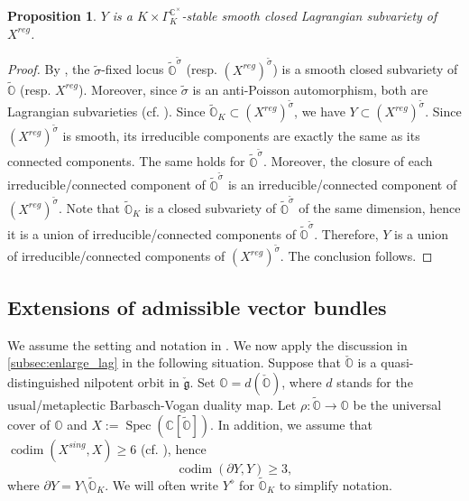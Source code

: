 \documentclass[11pt, a4paper]{amsart}
\newcommand{\C}{\mathbb{C}}
\newcommand{\orb}{\mathbb{O}}
\newcommand{\torbk}{\widetilde{\orb}_{K}}
\newcommand{\fg}{\mathfrak{g}}
\newcommand{\ckfg}{{\check{\fg}}}
\newcommand{\ckorb}{\check{\orb}}
\DeclareMathOperator{\codim}{codim}
\newcommand{\cm}{\C^\times}
\newcommand{\spec}{\operatorname{Spec}}
\newtheorem{Prop}[Thm]{Proposition}
\theoremstyle{definition}
\numberwithin{equation}{section}
\begin{document}
\begin{Prop} \label{prop:Y_lag}
	$Y$ is a $K \times \Gamma_K^{\cm}$-stable smooth closed Lagrangian subvariety of $X^{reg}$.
\end{Prop}

\begin{proof}
	By \cite[Proposition 3.4]{Edixhoven}, the $\tilde{\sigma}$-fixed locus $\widetilde{\orb}^{\tilde{\sigma}}$ (resp. $(X^{reg})^{\tilde{\sigma}}$) is a smooth closed subvariety of $\widetilde{\orb}$ (resp. $X^{reg}$). Moreover, since $\tilde{\sigma}$ is an anti-Poisson automorphism, both are Lagrangian subvarieties (cf. \cite[Corollary 5.20]{Vogan_AV}). Since $\torbk \subset (X^{reg})^{\tilde{\sigma}}$, we have $Y \subset (X^{reg})^{\tilde{\sigma}}$. Since $(X^{reg})^{\tilde{\sigma}}$ is smooth, its irreducible components are exactly the same as its connected components. The same holds for $\widetilde{\orb}^{\tilde{\sigma}}$. Moreover, the closure of each irreducible/connected component of $\widetilde{\orb}^{\tilde{\sigma}}$ is an irreducible/connected component of $(X^{reg})^{\tilde{\sigma}}$. Note that $\torbk$ is a closed subvariety of $\widetilde{\orb}^{\tilde{\sigma}}$ of the same dimension, hence it is a union of irreducible/connected components of $\widetilde{\orb}^{\tilde{\sigma}}$.
	Therefore, $Y$ is a union of irreducible/connected components of $(X^{reg})^{\tilde{\sigma}}$. The conclusion follows.
\end{proof}

\subsection{Extensions of admissible vector bundles} \label{subsec:adm_extn}

We assume the setting and notation in . We now apply the discussion in \cref{subsec:enlarge_lag} in the following situation.
Suppose that $\ckorb$ is a quasi-distinguished nilpotent orbit in $\ckfg$. Set $\orb = d(\ckorb)$, where $d$ stands for the usual/metaplectic Barbasch-Vogan duality map. Let $\rho: \widetilde{\orb} \to \orb$ be the universal cover of $\orb$ and $X := \spec(\C[\widetilde{\orb}])$. In addition, we assume that $\codim(X^{sing}, X) \geqslant 6$ (cf. ), hence
\begin{equation}\label{eq:codim_Y}
	\codim(\partial Y, Y) \geqslant 3,
\end{equation}
where $\partial Y = Y \setminus \torbk$. We will often write $Y^\diamond$ for $\torbk$ to simplify notation.
\end{document}
